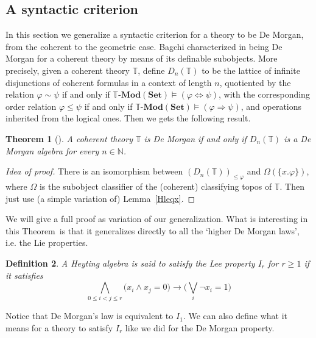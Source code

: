 \documentclass{article}
\newtheorem{theorem}{Theorem}
\newtheorem{definition}[theorem]{Definition}
\newcommand{\T}{\mathbb{T}}
\renewcommand{\phi}{\varphi}
\newcommand{\Set}{\mathbf{Set}}
\newcommand{\Mod}{{\mathbf{Mod}}}
\begin{document}
\subsection{A syntactic criterion}
In this section we generalize a syntactic criterion for a theory to be De Morgan, from the coherent to the geometric case. Bagchi characterized in \cite{bagchi1992morgan} being De Morgan for a coherent theory by means of its definable subobjects. More precisely, given a coherent theory $\mathbb{T}$, define $D_n(\mathbb{T})$ to be the lattice of infinite disjunctions of coherent formulas in a context of length $n$, quotiented by the relation $\phi\sim\psi$ if and only if $\T\text{-}\Mod(\Set)\models (\phi\Leftrightarrow\psi)$, with the corresponding order relation $\phi\leq\psi$ if and only if $\T\text{-}\Mod(\Set)\models (\phi\Rightarrow\psi)$, and operations inherited from the logical ones. Then we gets the following result.
\begin{theorem}[\cite{bagchi1992morgan}]\label{bagchi}
    A coherent theory $\mathbb{T}$ is De Morgan if and only if $D_n(\mathbb{T})$ is a De Morgan algebra for every $n\in\mathbb{N}$.
\end{theorem}
\begin{proof}[Idea of proof]
    There is an isomorphism between $(D_n(\mathbb{T}))_{\leq\phi}$ and $\Omega(\{x.\phi\})$, where $\Omega$ is the subobject classifier of the (coherent) classifying topos of $\mathbb{T}$. Then just use (a simple variation of) Lemma~\ref{Hleqx}. 
\end{proof}
We will give a full proof as variation of our generalization. What is interesting in this Theorem~is that it generalizes directly to all the `higher De Morgan laws', i.e. the Lie properties.
\begin{definition}
    A Heyting algebra is said to satisfy the Lee property $I_r$ for $r\geq 1$ if it satisfies
    $$\bigwedge_{0\leq i<j\leq r}\big( x_i\land x_j=0\big) \xrightarrow{} \big(\bigvee_i \neg x_i = 1\big)$$
\end{definition}
Notice that De Morgan's law is equivalent to $I_1$. We can also define what it means for a theory to satisfy $I_r$ like we did for the De Morgan property. \\
\\
\end{document}
